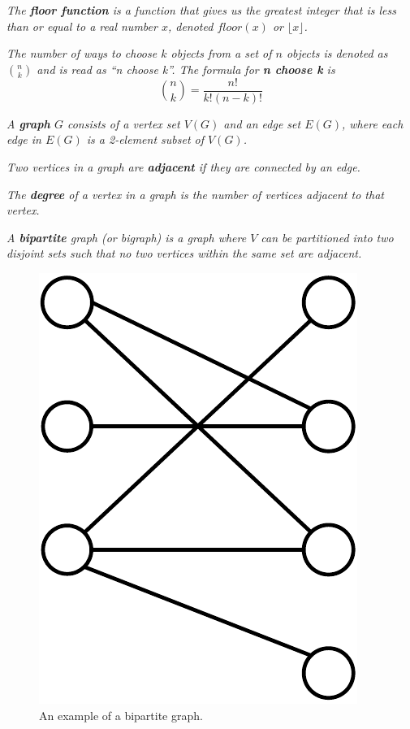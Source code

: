 \documentclass[10pt]{amsart}
\begin{document}
 \emph{The \textbf{floor function} is a function that gives us the 
greatest integer that is less than or equal to a real number $x$, denoted $floor(x)$ or 
$\lfloor x \rfloor$.}

 \emph{The number of ways to choose $k$ objects from a set of 
$n$ objects is denoted as $\binom{n}{k}$ and is read as ``n choose k''. The formula for 
\textbf{n choose k} is $$ \binom{n}{k} = \frac{n!}{ k!(n - k)! }$$}


 \emph{A \textbf{graph} $G$ consists of a vertex set $V(G)$ and an edge
set $E(G)$, where each edge in $E(G)$ is a 2-element subset of $V(G)$.}

 \emph{Two vertices in a graph are \textbf{adjacent} if they are 
connected by an edge.}

 \emph{The \textbf{degree} of a vertex in a graph is the number of vertices 
adjacent to that vertex.}

 \emph{A \textbf{bipartite} graph (or bigraph) is a graph where $V$ can be partitioned 
into two disjoint sets such that no two vertices within the same set are adjacent.}
\begin{figure}[h!]
    \centering
    \includegraphics[scale=.4]{../figures/bipartite_graph.pdf}
    \caption{An example of a bipartite graph.}
\end{figure}
\end{document}
